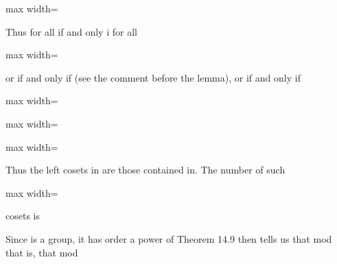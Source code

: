\documentclass[11pt,oneside]{article}
\begin{document}
\begin{BookBody}
\begin{center}\begin{adjustbox}{max width=\linewidth}\end{adjustbox}\end{center}

\noindent Thus for all if and only i for all

\begin{center}\begin{adjustbox}{max width=\linewidth}\end{adjustbox}\end{center}

\noindent or if and only if (see the comment before the lemma), or if and only if

\begin{center}\begin{adjustbox}{max width=\linewidth}\end{adjustbox}\end{center}

\begin{center}\begin{adjustbox}{max width=\linewidth}\end{adjustbox}\end{center}

\begin{center}\begin{adjustbox}{max width=\linewidth}\end{adjustbox}\end{center}

Thus the left cosets in are those contained in. The number of such

\begin{center}\begin{adjustbox}{max width=\linewidth}\end{adjustbox}\end{center}

\noindent cosets is

Since  is a group, it has order a power of  Theorem 14.9 then tells us that mod  that is, that mod \BookEnd{\blacklozenge}


\end{BookBody}
\end{document}
